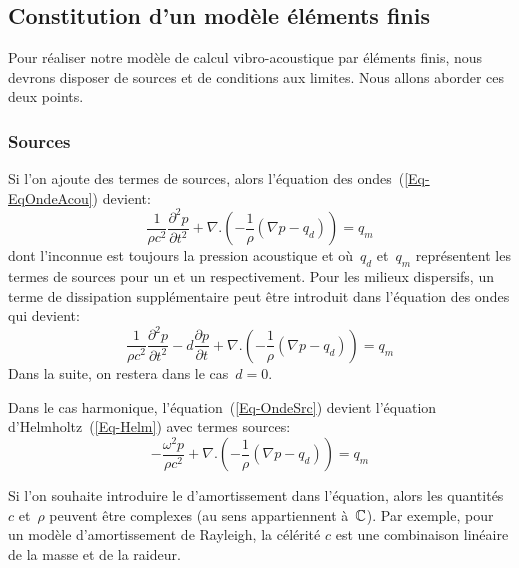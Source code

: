 \medskip
\subsection{Constitution d'un modèle éléments finis}

Pour réaliser notre modèle de calcul vibro-acoustique par éléments finis, nous devrons disposer de sources et de conditions aux limites. Nous allons aborder ces deux points.

\medskip
\subsubsection{Sources}

Si l'on ajoute des termes de sources, alors l'équation des ondes~(\ref{Eq-EqOndeAcou}) devient:
\begin{equation}\label{Eq-OndeSrc}
\dfrac{1}{\rho c^2}\dfrac{\partial^2p}{\partial t^2}+\nabla.\left(-\dfrac{1}{\rho}(\nabla p-q_d)\right)=q_m
\end{equation}
dont l'inconnue est toujours la pression acoustique et où~$q_d$ et~$q_m$ représentent les termes de sources pour un  et un  respectivement.
Pour les milieux dispersifs, un terme de dissipation supplémentaire peut être introduit dans l'équation des ondes qui devient:
\begin{equation}\label{Eq-OndeSrcAmort}
\dfrac{1}{\rho c^2}\dfrac{\partial^2p}{\partial t^2}-d\dfrac{\partial p}{\partial t}+\nabla.\left(-\dfrac{1}{\rho}(\nabla p-q_d)\right)=q_m
\end{equation}
Dans la suite, on restera dans le cas~$d=0$.

Dans le cas harmonique, l'équation~(\ref{Eq-OndeSrc}) devient l'équation d'Helmholtz~(\ref{Eq-Helm}) avec termes sources:
\begin{equation}
-\dfrac{\omega^2p}{\rho c^2}+\nabla.\left(-\dfrac{1}{\rho}(\nabla p-q_d)\right)=q_m
\end{equation}
\begin{remarque}
Si l'on souhaite introduire le d'amortissement dans l'équation, alors les quantités~$c$ et~$\rho$ peuvent être complexes (au sens appartiennent à~$\mathbb C$). Par exemple, pour un modèle d'amortissement de Rayleigh, la célérité $c$ est une combinaison linéaire de la masse et de la raideur.
\end{remarque}

